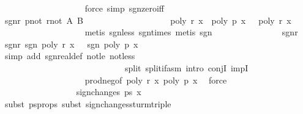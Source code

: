 \begin{isabellebody}
\ \ \ \ \ \ \ \ \ \ \ \ \ \ \ \ \ \ \isamarkupfalse%
\ {\isacharparenleft}force\ simp{\isacharcolon}\ sgn{\isacharunderscore}zero{\isacharunderscore}iff{\isacharparenright}\isanewline
\isanewline
\ \ \ \ \ \ \ \ \ \ \ \ \ \ \isamarkupfalse%
\ sgn{\isacharunderscore}r\ p{\isacharunderscore}not{\isacharunderscore}{}\ r{\isacharunderscore}not{\isacharunderscore}{}\ A\ B\isanewline
\ \ \ \ \ \ \ \ \ \ \ \ \ \ \ \ \ \ \isamarkupfalse%
\ {\isachardoublequoteopen}poly\ r\ x\ {\isacharasterisk}\ poly\ p\ x\ {\isacharless}\ {}{\isachardoublequoteclose}\ {\isachardoublequoteopen}poly\ r\ x\ {\isasymnoteq}\ {}{\isachardoublequoteclose}\isanewline
\ \ \ \ \ \ \ \ \ \ \ \ \ \ \ \ \ \ \isamarkupfalse%
\ {\isacharparenleft}metis\ sgn{\isacharunderscore}less\ sgn{\isacharunderscore}times{\isacharcomma}\ metis\ sgn{\isacharunderscore}{}{\isacharunderscore}{}{\isacharparenright}\isanewline
\ \ \ \ \ \ \ \ \ \ \ \ \ \ \isamarkupfalse%
\ sgn{\isacharunderscore}r\ \isamarkupfalse%
\ sgn{\isacharunderscore}r{\isacharprime}{\isacharcolon}\ {\isachardoublequoteopen}sgn\ {\isacharparenleft}poly\ r\ x{\isacharparenright}\ {\isacharequal}\ {\isacharminus}\ sgn\ {\isacharparenleft}poly\ p\ x{\isacharparenright}{\isachardoublequoteclose}\isanewline
\ \ \ \ \ \ \ \ \ \ \ \ \ \ \ \ \ \ \isamarkupfalse%
\ {\isacharparenleft}simp\ add{\isacharcolon}\ sgn{\isacharunderscore}real{\isacharunderscore}def\ not{\isacharunderscore}le\ not{\isacharunderscore}less\ \isanewline
\ \ \ \ \ \ \ \ \ \ \ \ \ \ \ \ \ \ \ \ \ \ \ \ \ \ \ \ \ split{\isacharcolon}\ split{\isacharunderscore}if{\isacharunderscore}asm{\isacharcomma}\ intro\ conjI\ impI{\isacharparenright}\isanewline
\ \ \ \ \ \ \ \ \ \ \ \ \ \ \ \ \ \ \isamarkupfalse%
\ prod{\isacharunderscore}neg{\isacharbrackleft}of\ {\isachardoublequoteopen}poly\ r\ x{\isachardoublequoteclose}\ {\isachardoublequoteopen}poly\ p\ x{\isachardoublequoteclose}{\isacharbrackright}\ \isamarkupfalse%
\ force{\isacharplus}\isanewline
\ \ \ \ \ \ \ \ \ \ \ \ \ \ \ \ \ \ \isamarkupfalse%
\isanewline
\isanewline
\ \ \ \ \ \ \ \ \ \ \ \ \ \ \isamarkupfalse%
\ {\isachardoublequoteopen}{}\ {\isacharequal}\ sign{\isacharunderscore}changes\ ps{\isacharprime}\ x\isanewline
\ \ \ \ \ \ \ \ \ \ \ \ \ \ \ \ \ \ \isamarkupfalse%
\ {\isacharparenleft}subst\ ps{\isacharprime}{\isacharunderscore}props{\isacharcomma}\ subst\ sign{\isacharunderscore}changes{\isacharunderscore}sturm{\isacharunderscore}triple{\isacharcomma}\ \isanewline

\end{isabellebody}
